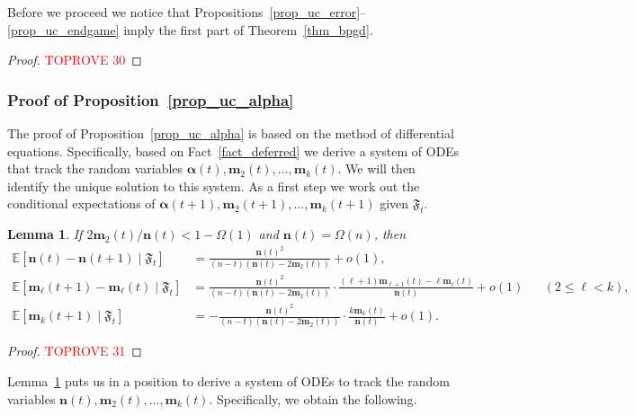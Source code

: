 \documentclass[10pt,reqno]{amsart}
\numberwithin{equation}{section}
\renewcommand{\vec}[1]{\boldsymbol{#1}}
\newcommand\fF{\mathfrak F}
\newcommand\vm{\vec m}
\newcommand\vn{\vec n}
\newcommand\Erw{\mathbb{E}}
\newcommand\ex{\Erw}
\newcommand\brk[1]{\left\lbrack{#1}\right\rbrack}
\newcommand\Lem{Lemma}
\newcommand\Prop{Proposition}
\newcommand\Thm{Theorem}
\newtheorem{lemma}[definition]{Lemma}
\begin{document}
Before we proceed we notice that \Prop s~\ref{prop_uc_error}--\ref{prop_uc_endgame} imply the first part of \Thm~\ref{thm_bpgd}.

\begin{proof}\textcolor{red}{TOPROVE 30}\end{proof}



\subsubsection{Proof of \Prop~\ref{prop_uc_alpha}}\label{sec_prop_uc_alpha}

The proof of \Prop~\ref{prop_uc_alpha} is based on the method of differential equations.
Specifically, based on Fact~\ref{fact_deferred} we derive a system of ODEs that track the random variables $\vec\alpha(t),\vm_2(t),\ldots,\vm_k(t)$.
We will then identify the unique solution to this system.
As a first step we work out the conditional expectations of $\vec\alpha(t+1),\vm_2(t+1),\ldots,\vm_k(t+1)$ given $\fF_t$.

\begin{lemma}\label{lem_condex}
	If $2\vm_2(t)/\vn(t)<1-\Omega(1)$ and $\vn(t)=\Omega(n)$, then 
	\begin{align}\label{eq_lem_condex_1}
		\ex\brk{\vn(t)-\vn(t+1)\mid\fF_t}&=\frac{\vn(t)^2}{(n-t)(\vn(t)-2\vm_2(t))}+o(1),\\
		\ex\brk{\vec m_\ell(t+1)-\vec m_\ell(t)\mid\fF_t}&=\frac{\vn(t)^2}{(n-t)(\vn(t)-2\vm_2(t))}\cdot\frac{(\ell+1)\vm_{\ell+1}(t)-\ell\vm_\ell(t)}{\vn(t)}+o(1)&&(2\leq\ell< k),\label{eq_lem_condex_2}\\
		\ex\brk{\vec m_k(t+1)\mid\fF_t}&=-\frac{\vn(t)^2}{(n-t)(\vn(t)-2\vm_2(t))}\cdot\frac{k\vm_k(t)}{\vn(t)}+o(1).\label{eq_lem_condex_3}
	\end{align}
\end{lemma}
\begin{proof}\textcolor{red}{TOPROVE 31}\end{proof}

\Lem~\ref{lem_condex} puts us in a position to derive a system of ODEs to track the random variables $\vn(t),\vm_2(t),\ldots,\vm_k(t)$.
Specifically, we obtain the following.
\end{document}

